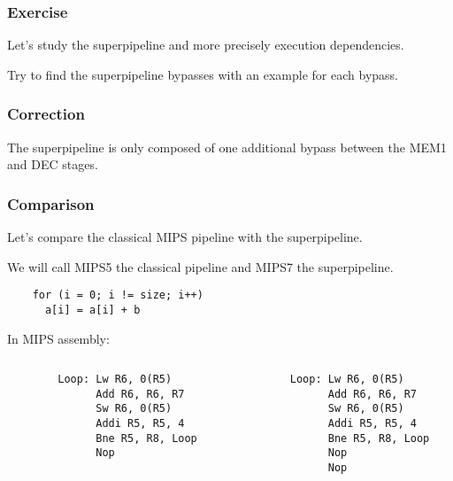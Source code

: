 
\begin{frame}
  \frametitle{Exercise}

  Let's study the superpipeline and more precisely execution dependencies.

  \nl

  Try to find the superpipeline bypasses with an example for each bypass.
\end{frame}


\begin{frame}
  \frametitle{Correction}

  The superpipeline is only composed of one additional bypass between
  the MEM1 and DEC stages.

  \begin{center}
  \end{center}
\end{frame}


\begin{frame}[containsverbatim]
  \frametitle{Comparison}

  Let's compare the classical MIPS pipeline with the superpipeline.

  \nl

  We will call MIPS5 the classical pipeline and MIPS7 the superpipeline.

  \begin{verbatim}
    for (i = 0; i != size; i++)
      a[i] = a[i] + b
  \end{verbatim}

  In MIPS assembly:

  \begin{columns}

    \begin{column}{6cm}
      \begin{verbatim}
        Loop: Lw R6, 0(R5)
              Add R6, R6, R7
              Sw R6, 0(R5)
              Addi R5, R5, 4
              Bne R5, R8, Loop
              Nop
      \end{verbatim}
    \end{column}

    \begin{column}{6cm}
      \begin{verbatim}
        Loop: Lw R6, 0(R5)
              Add R6, R6, R7
              Sw R6, 0(R5)
              Addi R5, R5, 4
              Bne R5, R8, Loop
              Nop
              Nop
      \end{verbatim}
    \end{column}
  \end{columns}
\end{frame}

